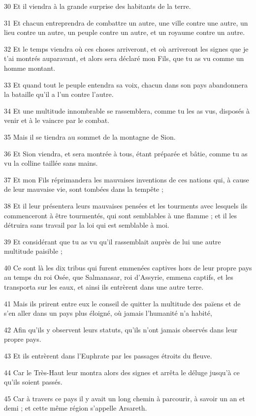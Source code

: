 \par 30 Et il viendra à la grande surprise des habitants de la terre.
\par 31 Et chacun entreprendra de combattre un autre, une ville contre une autre, un lieu contre un autre, un peuple contre un autre, et un royaume contre un autre.
\par 32 Et le temps viendra où ces choses arriveront, et où arriveront les signes que je t'ai montrés auparavant, et alors sera déclaré mon Fils, que tu as vu comme un homme montant.
\par 33 Et quand tout le peuple entendra sa voix, chacun dans son pays abandonnera la bataille qu'il a l'un contre l'autre.
\par 34 Et une multitude innombrable se rassemblera, comme tu les as vus, disposés à venir et à le vaincre par le combat.
\par 35 Mais il se tiendra au sommet de la montagne de Sion.
\par 36 Et Sion viendra, et sera montrée à tous, étant préparée et bâtie, comme tu as vu la colline taillée sans mains.
\par 37 Et mon Fils réprimandera les mauvaises inventions de ces nations qui, à cause de leur mauvaise vie, sont tombées dans la tempête ;
\par 38 Et il leur présentera leurs mauvaises pensées et les tourments avec lesquels ils commenceront à être tourmentés, qui sont semblables à une flamme ; et il les détruira sans travail par la loi qui est semblable à moi.
\par 39 Et considérant que tu as vu qu'il rassemblait auprès de lui une autre multitude paisible ;
\par 40 Ce sont là les dix tribus qui furent emmenées captives hors de leur propre pays au temps du roi Osée, que Salmanasar, roi d'Assyrie, emmena captifs, et les transporta sur les eaux, et ainsi ils entrèrent dans une autre terre.
\par 41 Mais ils prirent entre eux le conseil de quitter la multitude des païens et de s'en aller dans un pays plus éloigné, où jamais l'humanité n'a habité,
\par 42 Afin qu'ils y observent leurs statuts, qu'ils n'ont jamais observés dans leur propre pays.
\par 43 Et ils entrèrent dans l'Euphrate par les passages étroits du fleuve.
\par 44 Car le Très-Haut leur montra alors des signes et arrêta le déluge jusqu'à ce qu'ils soient passés.
\par 45 Car à travers ce pays il y avait un long chemin à parcourir, à savoir un an et demi ; et cette même région s'appelle Arsareth.
